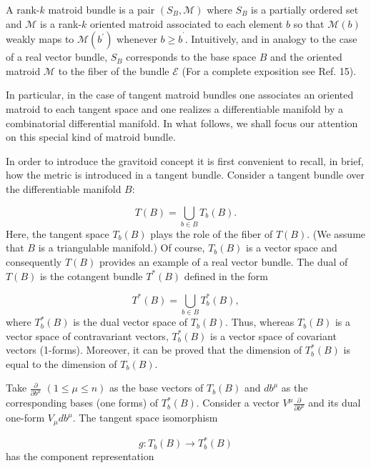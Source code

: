 \documentclass[a4paper,12pt]{article}
\begin{document}
A rank-$k$ matroid bundle is a pair $(S_{B},\mathcal{M})$ where $S_{B}$ is a
partially ordered set and $\mathcal{M}$ is a rank-$k$ oriented matroid
associated to each element $b$ so that $\mathcal{M}(b)$ weakly maps to $%
\mathcal{M}(b^{\prime })$ whenever $b\geq b^{^{\prime }}$. Intuitively, and
in analogy to the case of a real vector bundle, $S_{B}$ corresponds to the
base space $B$ and the oriented matroid $\mathcal{M}$ to the fiber of the
bundle $\mathcal{E}$ (For a complete exposition see Ref. 15).

In particular, in the case of tangent matroid bundles one associates an
oriented matroid to each tangent space and one realizes a differentiable
manifold by a combinatorial differential manifold. In what follows, we shall
focus our attention on this special kind of matroid bundle.

In order to introduce the gravitoid concept it is first convenient to
recall, in brief, how the metric is introduced in a tangent bundle. Consider
a tangent bundle over the differentiable manifold $B$:

\begin{equation}
T(B)=\bigcup_{b\in B}T_{b}(B).  \label{23}
\end{equation}
Here, the tangent space $T_{b}(B)$ plays the role of the fiber of $T(B)$.
(We assume that $B$ is a triangulable manifold.) Of course, $T_{b}(B)$ is a
vector space and consequently $T(B)$ provides an example of a real vector
bundle. The dual of $T(B)$ is the cotangent bundle $T^{\ast }(B)$ defined in
the form

\begin{equation}
T^{\ast }(B)=\bigcup_{b\in B}T_{b}^{\ast }(B),  \label{24}
\end{equation}
where $T_{b}^{\ast }(B)$ is the dual vector space of $T_{b}(B)$. Thus,
whereas $T_{b}(B)$ is a vector space of contravariant vectors, $T_{b}^{\ast
}(B)$ is a vector space of covariant vectors (1-forms). Moreover, it can be
proved that the dimension of $T_{b}^{\ast }(B)$ is equal to the dimension of 
$T_{b}(B)$.

Take $\frac{\partial }{\partial b^{\mu }}$ $(1\leq \mu \leq n)$ as the base
vectors of $T_{b}(B)$ and $db^{\mu }$ as the corresponding bases (one forms)
of $T_{b}^{\ast }(B)$. Consider a vector $V^{\mu }\frac{\partial }{\partial
b^{\mu }}$ and its dual one-form $V_{\mu }db^{\mu }$. The tangent space
isomorphism

\begin{equation}
g:T_{b}(B)\rightarrow T_{b}^{\ast }(B)  \label{25}
\end{equation}
has the component representation
\end{document}
